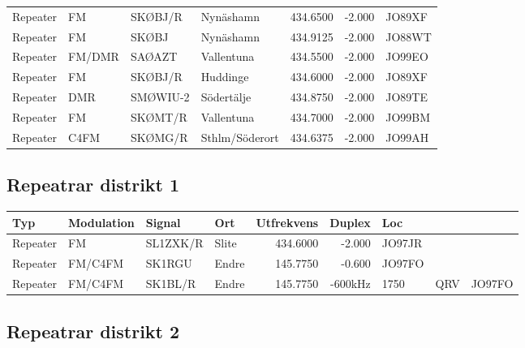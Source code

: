 \begin{longtable}{llllrrl}
	Repeater & FM         & SKØBJ/R  & Nynäshamn       &   434.6500 &   -2.000 & JO89XF \\
	Repeater & FM         & SKØBJ    & Nynäshamn       &   434.9125 &   -2.000 & JO88WT \\
	Repeater & FM/DMR     & SAØAZT   & Vallentuna      &   434.5500 &   -2.000 & JO99EO \\
	Repeater & FM         & SKØBJ/R  & Huddinge        &   434.6000 &   -2.000 & JO89XF \\
	Repeater & DMR        & SMØWIU-2 & Södertälje      &   434.8750 &   -2.000 & JO89TE \\
	Repeater & FM         & SKØMT/R  & Vallentuna      &   434.7000 &   -2.000 & JO99BM \\
	Repeater & C4FM       & SKØMG/R  & Sthlm/Söderort  &   434.6375 &   -2.000 & JO99AH
\end{longtable}

\subsection{Repeatrar distrikt 1}

\begin{longtable}{llllrrlcl}
	Typ      & Modulation & Signal   & Ort   & Utfrekvens &  Duplex & Loc    &  \\ \hline
	Repeater & FM         & SL1ZXK/R & Slite &   434.6000 &  -2.000 & JO97JR &     &  \\
	Repeater & FM/C4FM    & SK1RGU   & Endre &   145.7750 &  -0.600 & JO97FO &     &  \\
	Repeater & FM/C4FM    & SK1BL/R  & Endre &   145.7750 & -600kHz & 1750   & QRV & JO97FO
\end{longtable}

\subsection{Repeatrar distrikt 2}

